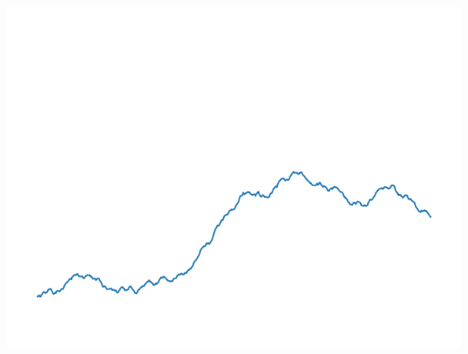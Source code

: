 \documentclass[11pt,class=report,crop=false]{standalone}
\begin{document}
\begin{exemple}
\begin{center}
\includegraphics[scale=\myscale,scale=0.2]{figures/landscape-05-10}


\end{center}
\end{exemple}
\end{document}
